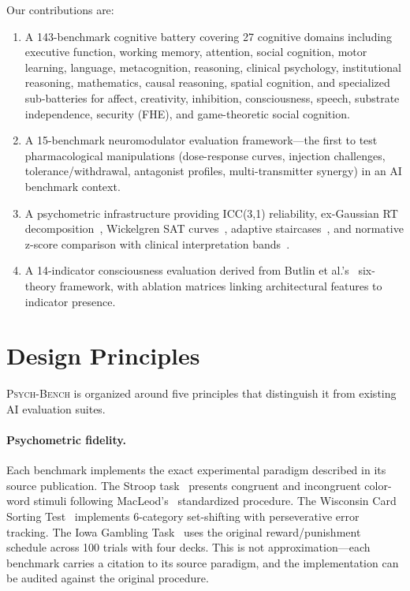 \documentclass[11pt,letterpaper]{article}
\newcommand{\psychbench}{\textsc{Psych-Bench}}
\begin{document}
Our contributions are:
\begin{enumerate}[nosep]
    \item A 143-benchmark cognitive battery covering 27 cognitive domains including executive function, working memory, attention, social cognition, motor learning, language, metacognition, reasoning, clinical psychology, institutional reasoning, mathematics, causal reasoning, spatial cognition, and specialized sub-batteries for affect, creativity, inhibition, consciousness, speech, substrate independence, security (FHE), and game-theoretic social cognition.
    \item A 15-benchmark neuromodulator evaluation framework---the first to test pharmacological manipulations (dose-response curves, injection challenges, tolerance/withdrawal, antagonist profiles, multi-transmitter synergy) in an AI benchmark context.
    \item A psychometric infrastructure providing ICC(3,1) reliability, ex-Gaussian RT decomposition~\citep{heathcote1996fitting}, Wickelgren SAT curves~\citep{wickelgren1977speed}, adaptive staircases~\citep{levitt1971transformed}, and normative z-score comparison with clinical interpretation bands~\citep{cicchetti1994guidelines}.
    \item A 14-indicator consciousness evaluation derived from Butlin et al.'s~\citep{butlin2023consciousness} six-theory framework, with ablation matrices linking architectural features to indicator presence.
\end{enumerate}

\section{Design Principles}
\label{sec:principles}

\psychbench{} is organized around five principles that distinguish it from existing AI evaluation suites.

\paragraph{Psychometric fidelity.} Each benchmark implements the exact experimental paradigm described in its source publication. The Stroop task~\citep{stroop1935interference} presents congruent and incongruent color-word stimuli following MacLeod's~\citep{macleod1991half} standardized procedure. The Wisconsin Card Sorting Test~\citep{berg1948simple} implements 6-category set-shifting with perseverative error tracking. The Iowa Gambling Task~\citep{bechara1994insensitivity} uses the original reward/punishment schedule across 100 trials with four decks. This is not approximation---each benchmark carries a citation to its source paradigm, and the implementation can be audited against the original procedure.
\end{document}
